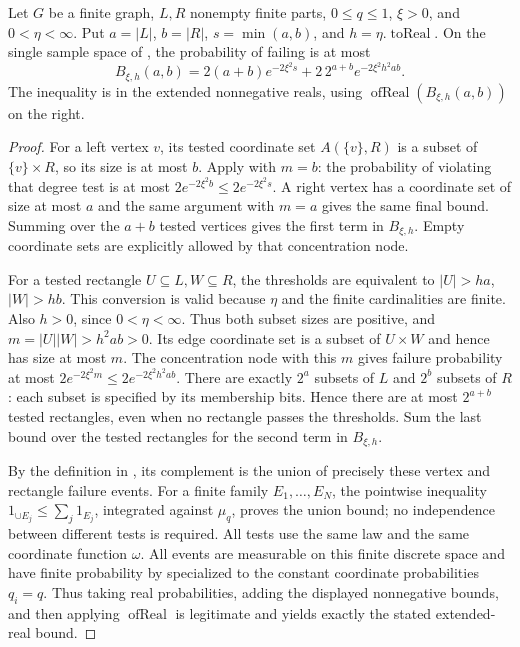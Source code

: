 \begin{lemma}
Let $G$ be a finite graph, $L,R$ nonempty finite parts, $0\leq q\leq1$,
$\xi>0$, and $0<\eta<\infty$. Put $a=|L|$, $b=|R|$, $s=\min(a,b)$,
and $h=\eta.\operatorname{toReal}$. On the single sample space of
, the probability of failing
 is at most
\[
B_{\xi,h}(a,b)=2(a+b)e^{-2\xi^2s}
       +2\,2^{a+b}e^{-2\xi^2h^2ab}.
\]
The inequality is in the extended nonnegative reals, using
$\operatorname{ofReal}(B_{\xi,h}(a,b))$ on the right.
\end{lemma}
\begin{proof}
For a left vertex $v$, its tested coordinate set
$A(\{v\},R)$ is a subset of $\{v\}\times R$, so its size is at most $b$.
Apply  with $m=b$:
the probability of violating that degree test is at most
$2e^{-2\xi^2b}\leq2e^{-2\xi^2s}$. A right vertex has a coordinate
set of size at most $a$ and the same argument with $m=a$ gives the
same final bound. Summing over the $a+b$ tested vertices gives the
first term in $B_{\xi,h}$. Empty coordinate sets are explicitly allowed
by that concentration node.

For a tested rectangle $U\subseteq L,W\subseteq R$, the thresholds
are equivalent to $|U|>ha$, $|W|>hb$. This conversion is valid because
$\eta$ and the finite cardinalities are finite. Also $h>0$, since
$0<\eta<\infty$. Thus both subset sizes are positive, and
$m=|U||W|>h^2ab>0$. Its edge coordinate set is a subset of $U\times W$
and hence has size at most $m$. The concentration node with this $m$
gives failure probability at most
$2e^{-2\xi^2m}\leq2e^{-2\xi^2h^2ab}$.
There are exactly $2^a$ subsets of $L$ and $2^b$ subsets of $R$: each
subset is specified by its membership bits. Hence there are at most
$2^{a+b}$ tested rectangles, even when no rectangle passes the
thresholds. Sum the last bound over the tested rectangles for the
second term in $B_{\xi,h}$.

By the definition in , its complement
is the union of precisely these vertex and rectangle failure events.
For a finite family $E_1,\ldots,E_N$, the pointwise inequality
$1_{\cup E_j}\leq\sum_j1_{E_j}$, integrated against $\mu_q$, proves
the union bound; no independence between different tests is required.
All tests use the same law and the same coordinate function $\omega$.
All events are measurable on this finite discrete space and have
finite probability by 
specialized to the constant coordinate probabilities $q_i=q$. Thus taking
real probabilities, adding the displayed nonnegative bounds, and then
applying $\operatorname{ofReal}$ is legitimate and yields exactly the
stated extended-real bound.
\end{proof}
